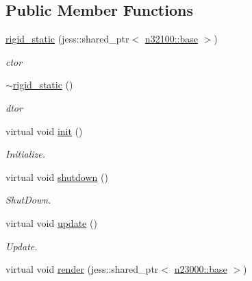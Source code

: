 \subsection*{Public Member Functions}
\begin{DoxyCompactItemize}
\item 
\hyperlink{classnebula_1_1content_1_1actor_1_1admin_1_1rigid__static_a3a9f67717f0d7473f17ed0099a2a658f}{rigid\_\-static} (jess::shared\_\-ptr$<$ \hyperlink{classnebula_1_1content_1_1scene_1_1admin_1_1base}{n32100::base} $>$)
\begin{DoxyCompactList}\small\item\em ctor \item\end{DoxyCompactList}\item 
\hyperlink{classnebula_1_1content_1_1actor_1_1admin_1_1rigid__static_aa75efea896b4c8dede3d36d05b224878}{$\sim$rigid\_\-static} ()
\begin{DoxyCompactList}\small\item\em dtor \item\end{DoxyCompactList}\item 
virtual void \hyperlink{classnebula_1_1content_1_1actor_1_1admin_1_1rigid__static_a12aee11a228e35bd7a8b36ff411387a8}{init} ()
\begin{DoxyCompactList}\small\item\em Initialize. \item\end{DoxyCompactList}\item 
virtual void \hyperlink{classnebula_1_1content_1_1actor_1_1admin_1_1rigid__static_a813d55717971528046af12804e01ff4e}{shutdown} ()
\begin{DoxyCompactList}\small\item\em ShutDown. \item\end{DoxyCompactList}\item 
virtual void \hyperlink{classnebula_1_1content_1_1actor_1_1admin_1_1rigid__static_af7ecdabc256260e8ae07436b3bc4854f}{update} ()
\begin{DoxyCompactList}\small\item\em Update. \item\end{DoxyCompactList}\item 
virtual void \hyperlink{classnebula_1_1content_1_1actor_1_1admin_1_1rigid__static_a574621febd60cbfd2949c00430d7f5f3}{render} (jess::shared\_\-ptr$<$ \hyperlink{classnebula_1_1platform_1_1renderer_1_1base}{n23000::base} $>$)

\end{DoxyCompactItemize}
